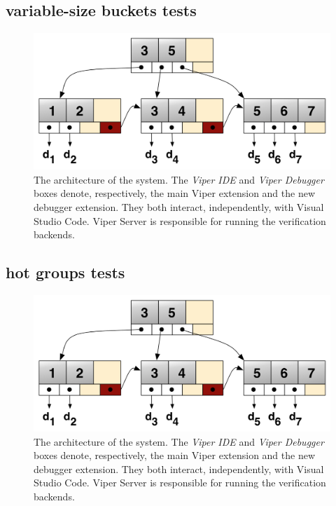 \subsection{variable-size buckets tests}\label{sec:variable-size buckets-tests}
\begin{figure}[htb]
  \centering
  \includegraphics[width=\textwidth,height=\textheight,keepaspectratio]{img/b+tree.png}
  \caption[The architecture of the system]{ The architecture of the system. The
    \textit{Viper IDE} and \textit{Viper Debugger} boxes denote, respectively,
    the main Viper extension and the new debugger extension. They both interact,
    independently, with Visual Studio Code. Viper Server is responsible for
    running the verification backends.}
  \label{fig:b+tree}
\end{figure}
\subsection{hot groups tests}\label{sec:hot-gropus-tests}
\begin{figure}[htb]
  \centering
  \includegraphics[width=\textwidth,height=\textheight,keepaspectratio]{img/b+tree.png}
  \caption[The architecture of the system]{ The architecture of the system. The
    \textit{Viper IDE} and \textit{Viper Debugger} boxes denote, respectively,
    the main Viper extension and the new debugger extension. They both interact,
    independently, with Visual Studio Code. Viper Server is responsible for
    running the verification backends.}
  \label{fig:b+tree}
\end{figure}
